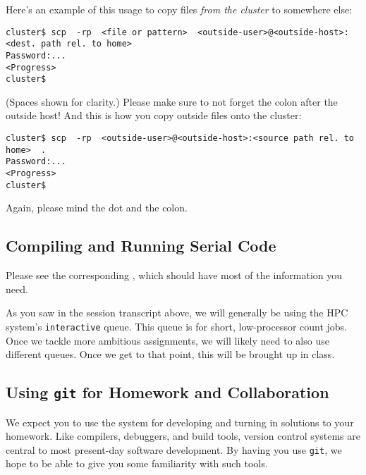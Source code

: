 \documentclass[11pt]{article}
\begin{document}
Here's an example of this usage to copy files \emph{from the cluster}
to somewhere else:
\begin{lstlisting}
cluster$ scp  -rp  <file or pattern>  <outside-user>@<outside-host>:<dest. path rel. to home>
Password:...
<Progress>
cluster$
\end{lstlisting}
(Spaces shown for clarity.) Please make sure to not forget the colon
after the outside host!  And this is how you copy outside files onto
the cluster:
\begin{lstlisting}
cluster$ scp  -rp  <outside-user>@<outside-host>:<source path rel. to home>  .
Password:...
<Progress>
cluster$
\end{lstlisting}
Again, please mind the dot and the colon.

\subsection*{Compiling and Running Serial Code}

Please see the corresponding
, which should have most of the information you need.

As you saw in the session transcript above, we will generally be using
the HPC system's \texttt{interactive} queue. This queue is for short,
low-processor count jobs. Once we tackle more ambitious assignments,
we will likely need to also use different queues. Once we get to that
point, this will be brought up in class.

\subsection*{Using \texttt{git} for Homework and Collaboration}

We expect you to use the
 system  for
developing and turning in solutions to your homework. Like compilers,
debuggers, and build tools, version control systems are central to
most present-day software development. By having you use \texttt{git},
we hope to be able to give you some familiarity with such tools.
\end{document}
